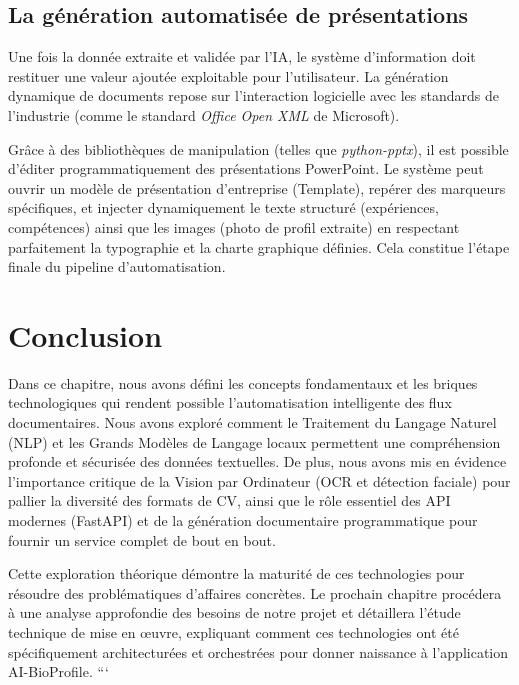 \subsection{La génération automatisée de présentations}
Une fois la donnée extraite et validée par l'IA, le système d'information doit restituer une valeur ajoutée exploitable pour l'utilisateur. La génération dynamique de documents repose sur l'interaction logicielle avec les standards de l'industrie (comme le standard \textit{Office Open XML} de Microsoft).

Grâce à des bibliothèques de manipulation (telles que \textit{python-pptx}), il est possible d'éditer programmatiquement des présentations PowerPoint. Le système peut ouvrir un modèle de présentation d'entreprise (Template), repérer des marqueurs spécifiques, et injecter dynamiquement le texte structuré (expériences, compétences) ainsi que les images (photo de profil extraite) en respectant parfaitement la typographie et la charte graphique définies. Cela constitue l'étape finale du pipeline d'automatisation.


\section{Conclusion}

Dans ce chapitre, nous avons défini les concepts fondamentaux et les briques technologiques qui rendent possible l'automatisation intelligente des flux documentaires. Nous avons exploré comment le Traitement du Langage Naturel (NLP) et les Grands Modèles de Langage locaux permettent une compréhension profonde et sécurisée des données textuelles. De plus, nous avons mis en évidence l'importance critique de la Vision par Ordinateur (OCR et détection faciale) pour pallier la diversité des formats de CV, ainsi que le rôle essentiel des API modernes (FastAPI) et de la génération documentaire programmatique pour fournir un service complet de bout en bout. 

Cette exploration théorique démontre la maturité de ces technologies pour résoudre des problématiques d'affaires concrètes. Le prochain chapitre procédera à une analyse approfondie des besoins de notre projet et détaillera l'étude technique de mise en œuvre, expliquant comment ces technologies ont été spécifiquement architecturées et orchestrées pour donner naissance à l'application AI-BioProfile.
```